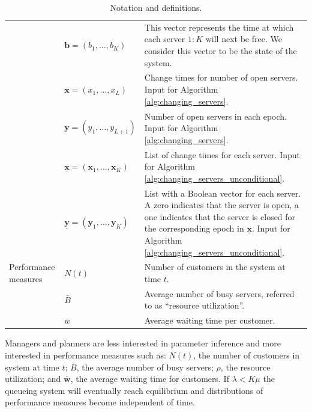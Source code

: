 \documentclass[article]{jss}
\begin{document}
\begin{table}
\begin{tabular}{llp{14cm}}
& $\mathbf{b} = (b_1, \ldots, b_K )$ & This vector represents the time at which each server $1:K$ will next be free. We consider this vector to be the state of the system. \\ 

& $\mathbf{x} = (x_1, \ldots, x_L )$ & Change times for number of open servers. Input for Algorithm \ref{alg:changing_servers}. \\ 

& $\mathbf{y} = (y_1, \ldots, y_{L+1} )$ & Number of open servers in each epoch. Input for Algorithm \ref{alg:changing_servers}.  \\

& $\mathbf{\underline{x}} = (\mathbf{x}_1, \ldots, \mathbf{x}_K )$ & List of change times for each server. Input for Algorithm \ref{alg:changing_servers_unconditional}. \\ 

& $\mathbf{\underline{y}} = (\mathbf{y}_1, \ldots, \mathbf{y}_K )$ & List with a Boolean vector for each server. A zero indicates that the server is open, a one indicates that the server is closed for the corresponding epoch in $\mathbf{\underline{x}}$. Input for Algorithm \ref{alg:changing_servers_unconditional}. \\ 

\hline

Performance measures

& $N(t)$ & Number of customers in the system at time $t$. \\
& $\bar{B}$ & Average number of busy servers, referred to as ``resource utilization''. \\
& $\bar{w}$ & Average waiting time per customer. \\

\hline
\end{tabular}
\caption{Notation and definitions.}\label{tab:notation}
\end{table}

Managers and planners are less interested in parameter inference and
more interested in performance measures such as: $N(t)$, the number of
customers in system at time $t$; $\bar{B}$, the average number of busy
servers; $\rho$, the resource utilization; and $\bar{\mathbf{w}}$, the
average waiting time for customers. If $\lambda < K \mu$ the queueing
system will eventually reach equilibrium and distributions of
performance measures become independent of time.
\end{document}
